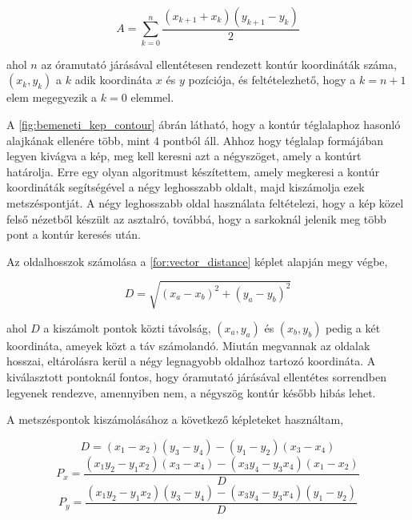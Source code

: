 \begin{equation}
    A = \sum^n_{k=0}\frac{(x_{k+1} + x_k)(y_{k+1} - y_k)}{2}
    \label{for:green_formula}
\end{equation}

\par ahol $n$ az óramutató járásával ellentétesen rendezett kontúr koordináták száma, $(x_k, y_k)$ a $k$ adik koordináta $x$ és $y$ pozíciója, és feltételezhető, hogy a $k = n+1$ elem megegyezik a $k = 0$ elemmel.

\par A \ref{fig:bemeneti_kep_contour} ábrán látható, hogy a kontúr téglalaphoz hasonló alajkának ellenére több, mint 4 pontból áll. Ahhoz hogy téglalap formájában legyen kivágva a kép, meg kell keresni azt a négyszöget, amely a kontúrt határolja. Erre egy olyan algoritmust készítettem, amely megkeresi a kontúr koordináták segítségével a négy leghosszabb oldalt, majd kiszámolja ezek metszéspontját. A négy leghosszabb oldal használata feltételezi, hogy a kép közel felső nézetből készült az asztalró, továbbá, hogy a sarkoknál jelenik meg több pont a kontúr keresés után.
\par Az oldalhosszok számolása a \ref{for:vector_distance} képlet alapján megy végbe,

\begin{equation}
    D = \sqrt{(x_a-x_b)^2 + (y_a-y_b)^2}
    \label{for:vector_distance}
\end{equation}

\par ahol $D$ a kiszámolt pontok közti távolság, $(x_a,y_a)$ és $(x_b,y_b)$ pedig a két koordináta, ameyek közt a táv számolandó. Miután megvannak az oldalak hosszai, eltárolásra kerül a négy legnagyobb oldalhoz tartozó koordináta. A kiválasztott pontoknál fontos, hogy óramutató járásával ellentétes sorrendben legyenek rendezve, amennyiben nem, a négyszög kontúr később hibás lehet.
\par A metszéspontok kiszámolásához a következő képleteket \cite{line_line} használtam,

\begin{equation}
    D = (x_1 - x_2)(y_3 - y_4) - (y_1 - y_2)(x_3 - x_4)
    \label{for:vector_intersection_denominator}
\end{equation}
\begin{equation}
    P_x = \frac{(x_1y_2 - y_1x_2)(x_3 - x_4) - (x_3y_4 - y_3x_4)(x_1 - x_2)}{D}
    \label{for:vector_intersection_point_x}
\end{equation}
\begin{equation}
    P_y = \frac{(x_1y_2 - y_1x_2)(y_3 - y_4) - (x_3y_4 - y_3x_4)(y_1 - y_2)}{D}
    \label{for:vector_intersection_point_y}
\end{equation}

